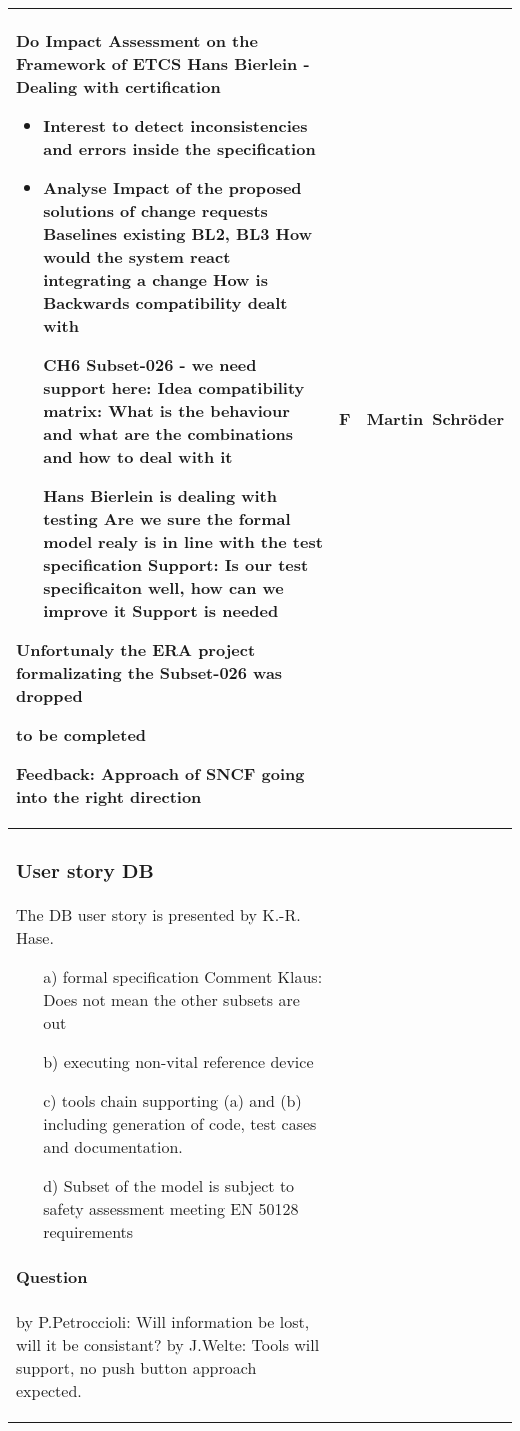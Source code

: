 \documentclass[a4paper]{article}
\newcommand{\Q}[2]{\paragraph{Question} by {#1}: #2}
\newcommand{\A}[2]{\newline{\textbf{Answer}} by {#1}: #2}
\begin{document}
\begin{longtable}{|p{}|p{}|p{}|}
Do Impact Assessment on the Framework of ETCS
Hans Bierlein - Dealing with certification 

\begin{itemize}
\item{Interest} to detect inconsistencies and errors inside the specification
\item{Analyse Impact} of the proposed solutions of change requests
 Baselines existing BL2, BL3
How would the system react integrating a change
How is Backwards compatibility dealt with

CH6 Subset-026 - we need support here:
Idea compatibility matrix: What is the behaviour and what are the combinations and how to deal with it

Hans Bierlein is dealing with testing
Are we sure the formal model realy is in line with the test  specification
Support: Is our test specificaiton well, how can we improve it
Support is needed
\end{itemize}

Unfortunaly the ERA project formalizating the Subset-026 was dropped %

\newline
to be completed
\newline



Feedback: Approach of SNCF going into the right direction
& F
& Martin\ Schr\"{o}der
\\\hline
\setcounter{subsubsection}{2}
\subsubsection {User story DB} %
The DB user story is presented by K.-R. Hase.

\begin{itemize}
	\item [a)] formal specification
Comment Klaus: Does not mean the other subsets are out
	\item [b)] executing non-vital reference device
	\item [c)] tools chain supporting (a) and (b) including generation of code, test cases and documentation.
	\item [d)] Subset of the model is subject to safety assessment meeting EN 50128 requirements
\end{itemize}

\Q{P.Petroccioli}{Will information be lost, will it be consistant?}
\A{J.Welte}{Tools will support, no push button approach expected.} 



\end{longtable}
\end{document}
